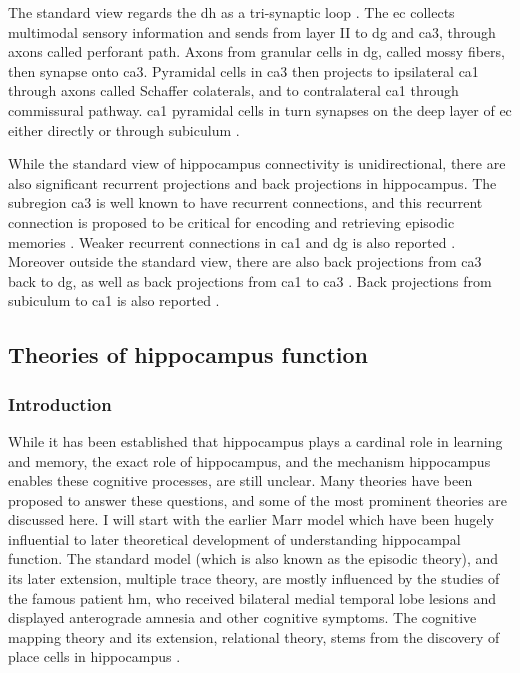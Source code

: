 The standard view regards the \gls{dh} as a tri-synaptic loop \citep{strien09}. The \gls{ec} collects multimodal sensory information and sends from layer II to \gls{dg} and \gls{ca3}, through axons called perforant path. Axons from granular cells in \gls{dg}, called mossy fibers, then synapse onto \gls{ca3}. Pyramidal cells in \gls{ca3} then projects to ipsilateral \gls{ca1} through axons called Schaffer colaterals, and to contralateral \gls{ca1} through commissural pathway. \gls{ca1} pyramidal cells in turn synapses on the deep layer of \gls{ec} either directly or through subiculum \citep{strien09}.

While the standard view of hippocampus connectivity is unidirectional, there are also significant recurrent projections and back projections in hippocampus. The subregion \gls{ca3} is well known to have recurrent connections, and this recurrent connection is proposed to be critical for encoding and retrieving episodic memories \citep{nakazawa02, rolls07}. Weaker recurrent connections in \gls{ca1} and \gls{dg} is also reported \citep{swanson81, ishizuka90, buckmaster93}. Moreover outside the standard view, there are also back projections from \gls{ca3} back to \gls{dg}, as well as back projections from \gls{ca1} to \gls{ca3} \citep{swanson81, li94}. Back projections from subiculum to \gls{ca1} is also reported \citep{finch83}. 

\subsection{Theories of hippocampus function}
\subsubsection{Introduction}
While it has been established that hippocampus plays a cardinal role in learning and memory, the exact role of hippocampus, and the mechanism hippocampus enables these cognitive processes, are still unclear. Many theories have been proposed to answer these questions, and some of the most prominent theories are discussed here. I will start with the earlier Marr model \citep{marr71} which have been hugely influential to later theoretical development of understanding hippocampal function. The standard model (which is also known as the episodic theory), and its later extension, multiple trace theory, are mostly influenced by the studies of the famous patient \gls{hm}, who received bilateral medial temporal lobe lesions and displayed anterograde amnesia and other cognitive symptoms. The cognitive mapping theory and its extension, relational theory, stems from the discovery of place cells in hippocampus \citep{o'keefe71}. 


